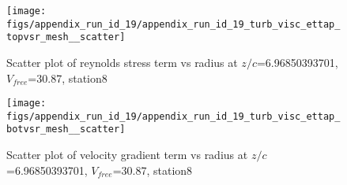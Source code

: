 \begin{figure}[H]
\centering
\texttt{[image: figs/appendix\_run\_id\_19/appendix\_run\_id\_19\_turb\_visc\_ettap\_topvsr\_mesh\_\_scatter]}
\caption{Scatter plot of reynolds stress term vs radius at $z/c$=6.96850393701, $V_{free}$=30.87, station8}
\label{fig:appendix_run_id_19_turb_visc_ettap_topvsr_mesh__scatter}
\end{figure}


\begin{figure}[H]
\centering
\texttt{[image: figs/appendix\_run\_id\_19/appendix\_run\_id\_19\_turb\_visc\_ettap\_botvsr\_mesh\_\_scatter]}
\caption{Scatter plot of velocity gradient term vs radius at $z/c$=6.96850393701, $V_{free}$=30.87, station8}
\label{fig:appendix_run_id_19_turb_visc_ettap_botvsr_mesh__scatter}
\end{figure}


